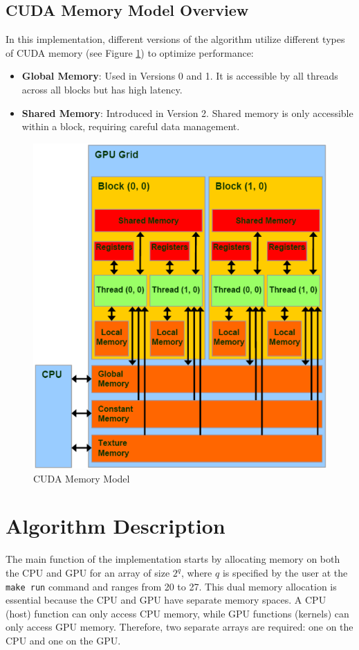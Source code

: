 \documentclass[a4paper,12pt]{article}
\begin{document}
\subsection{CUDA Memory Model Overview}
In this implementation, different versions of the algorithm utilize different types of CUDA memory (see Figure \ref{fig:CUDA}) to optimize performance:  

\begin{itemize}  
    \item \textbf{Global Memory}: Used in Versions 0 and 1. It is accessible by all threads across all blocks but has high latency.
    \item \textbf{Shared Memory}: Introduced in Version 2. Shared memory is only accessible within a block, requiring careful data management.  
\end{itemize}  

\begin{figure}[H]
    \centering
    \includegraphics[width=0.5\linewidth]{assets/CUDA Memory Model.png}
    \caption{CUDA Memory Model}
    \label{fig:CUDA}
\end{figure}

\section{Algorithm Description}

The main function of the implementation starts by allocating memory on both the CPU and GPU for an array of size \(2^q\), where \(q\) is specified by the user at the \texttt{make run} command and ranges from 20 to 27. This dual memory allocation is essential because the CPU and GPU have separate memory spaces. A CPU (host) function can only access CPU memory, while GPU functions (kernels) can only access GPU memory. Therefore, two separate arrays are required: one on the CPU and one on the GPU. 
\end{document}
